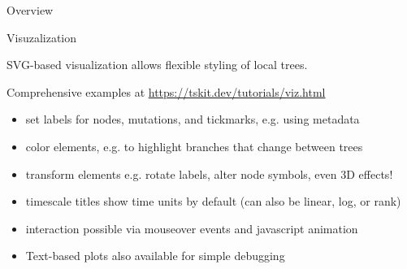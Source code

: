 \documentclass[landscape,a0paper,fontscale=0.5]{baposter}
\newcommand{\compresslist}{%
 \setlength{\itemsep}{1pt}%
 \setlength{\parskip}{0pt}%
 \setlength{\parsep}{0pt}%
 }
\begin{document}
\begin{poster}
\begin{posterbox}[name=overview,column=1,row=0,span=2]{Overview}
\end{posterbox}

\begin{posterbox}[name=viz,column=1,row=0,span=2,below=overview]{Visuzalization}

SVG-based visualization allows flexible styling of local trees.

Comprehensive examples at \url{https://tskit.dev/tutorials/viz.html}


% 
% 

\begin{multicols}{2}

\begin{itemize} \compresslist
    \item set labels for nodes, mutations, and tickmarks, e.g. using metadata
    \item color elements, e.g. to highlight branches that change between trees
    \item transform elements e.g. rotate labels, alter node symbols, even 3D effects!
    \item timescale titles show time units by default (can also be linear, log, or rank)
    \item interaction possible via mouseover events and javascript animation
    \item Text-based plots also available for simple debugging
\end{itemize}

% 
% 


\end{multicols}
\end{posterbox}
\end{poster}
\end{document}
